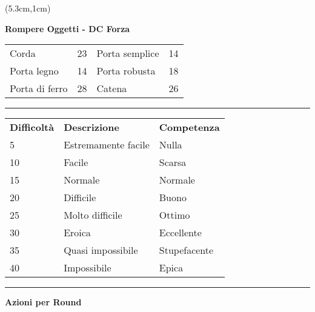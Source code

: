 \documentclass[a4paper,12 pt,openany]{book}
\newcommand{\riga}{\rule{\textwidth}{0.4pt}}
\begin{document}
\begin{textblock*}{8.3cm}(5.3cm,1cm)

\textbf{Rompere Oggetti - DC Forza}\\
\begin{tabular}{ll|ll}
Corda   		   & 23&	Porta semplice         & 14\\
Porta legno        & 14&	Porta robusta          & 18\\
Porta di ferro     & 28&	Catena                 & 26 \\
\end{tabular}

\riga

\begin{tabular}{lll}
\textbf{Difficoltà} & \textbf{Descrizione} & \textbf{Competenza} \\
5 & Estremamente facile  & Nulla\\
10  & Facile & Scarsa\\
15  & Normale  & Normale\\
20  & Difficile  & Buono\\
25  & Molto difficile  & Ottimo\\
30  & Eroica  	 & Eccellente\\
35  & Quasi impossibile & Stupefacente\\
40  & Impossibile  & Epica\\
\end{tabular}





\riga

\textbf{Azioni per Round} 


\end{textblock*}
\end{document}
